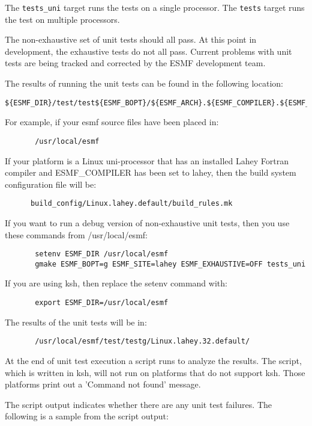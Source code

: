 The {\tt tests\_uni} target runs the tests on a single processor. 
The {\tt tests} target runs the test on multiple processors.

The non-exhaustive set of unit tests should all pass.  At this point in 
development, the exhaustive tests do not all pass.  Current problems with 
unit tests are being tracked and corrected by the ESMF development team.

The results of running the unit tests can be found in the following location:
\begin{verbatim}
${ESMF_DIR}/test/test${ESMF_BOPT}/${ESMF_ARCH}.${ESMF_COMPILER}.${ESMF_PREC}.${ESMF_SITE}
\end{verbatim}

For example, if your esmf source files have been placed in: 
\begin{verbatim}
       /usr/local/esmf
\end{verbatim}

If your platform is a Linux uni-processor that has an installed Lahey
Fortran compiler and ESMF\_COMPILER has been set to lahey, then the build
system configuration file will be:

\begin{verbatim}
      build_config/Linux.lahey.default/build_rules.mk
\end{verbatim}

If you want to run a debug version of non-exhaustive unit tests,
then you use these commands from /usr/local/esmf:

\begin{verbatim}
       setenv ESMF_DIR /usr/local/esmf
       gmake ESMF_BOPT=g ESMF_SITE=lahey ESMF_EXHAUSTIVE=OFF tests_uni
\end{verbatim}


If you are using ksh, then replace the setenv command with:
\begin{verbatim}
       export ESMF_DIR=/usr/local/esmf
\end{verbatim}

The results of the unit tests will be in:
\begin{verbatim}
       /usr/local/esmf/test/testg/Linux.lahey.32.default/
\end{verbatim}

At the end of unit test execution a script runs to analyze the results.
The script, which is written in ksh, will not run on platforms that do not support
ksh. Those platforms print out a 'Command not found' message.

The script output indicates whether there are any unit test failures.
The following is a sample from the script output:

